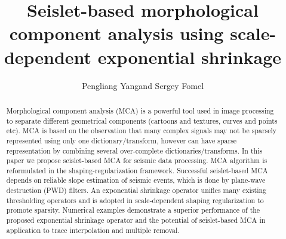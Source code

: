 
\title{Seislet-based morphological component analysis using scale-dependent exponential shrinkage}

\renewcommand{\thefootnote}{\fnsymbol{footnote}}

\author{Pengliang Yang\footnotemark[1] and Sergey Fomel\footnotemark[2]}

\address{
\footnotemark[1] Xi'an Jiaotong University\\
National Engineering Laboratory for Offshore Oil Exploration\\
Xi'an 710049, China \\
\footnotemark[2] Bureau of Economic Geology,\\
John A. and Katherine G. Jackson School of Geosciences \\
The University of Texas at Austin \\
University Station, Box X \\
Austin, TX 78713-8924, USA}



\maketitle


\begin{abstract}
Morphological component analysis (MCA) is a powerful tool used in image processing to separate different geometrical components (cartoons and textures, curves and points etc). MCA is based on the observation that many complex signals may not be sparsely represented using only one dictionary/transform, however can have sparse representation by combining several over-complete dictionaries/transforms. In this paper we propose seislet-based MCA for seismic data processing. MCA algorithm is reformulated in the shaping-regularization framework. Successful seislet-based MCA depends on reliable slope estimation of seismic events, which is done by plane-wave destruction (PWD) filters. An exponential shrinkage operator unifies many existing thresholding operators and is adopted in scale-dependent shaping regularization to promote sparsity. Numerical examples demonstrate a superior performance of the proposed exponential shrinkage operator and the potential of seislet-based MCA in application to trace interpolation and multiple removal.
\end{abstract}


